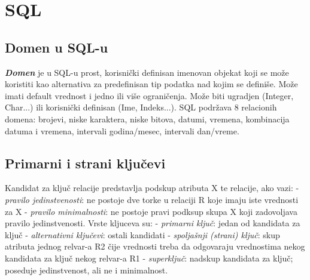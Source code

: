 \documentclass{article}
\begin{document}
\newpage

\section{SQL}

\subsection{Domen u SQL-u} 
\textit{\textbf{Domen}} je u SQL-u prost, korisnički definisan imenovan
objekat koji se može koristiti kao alternativa za predefinisan tip
podatka nad kojim se definiše. Može imati default
vrednost i jedno ili više ograničenja. Može biti ugradjen (Integer,
Char...) ili korisnički definisan (Ime, Indeks...). SQL podržava 8
relacionih domena: brojevi, niske karaktera, niske bitova, datumi, 
vremena, kombinacija datuma i vremena, intervali godina/mesec,
intervali dan/vreme.

\subsection{Primarni i strani ključevi}
Kandidat za ključ relacije predstavlja podskup atributa X te relacije,
ako vazi: \newline
\hspace*{0.2cm}- \textit{pravilo jedinstvenosti}: ne postoje dve torke
u relaciji R koje imaju iste vrednosti za X
\newline \hspace*{0.2cm}- \textit{pravilo minimalnosti}: ne postoje
pravi podksup skupa X koji zadovoljava pravilo jedinstvenosti.
\vspace{0.2cm} \newline 
Vrste kljuceva su:
\newline \hspace*{0.2cm}- \textit{primarni ključ}: jedan od kandidata
za ključ
\newline \hspace*{0.2cm}- \textit{alternativni ključevi}: ostali
kandidati
\newline \hspace*{0.2cm}- \textit{spoljašnji (strani) ključ}: skup
atributa jednog relvar-a R2 čije vrednosti treba da
odgovaraju vrednostima nekog kandidata za ključ nekog relvar-a R1
\newline \hspace*{0.2cm}- \textit{superključ}: nadskup kandidata za
ključ; poseduje jedinstvenost, ali ne i minimalnost.
\end{document}
